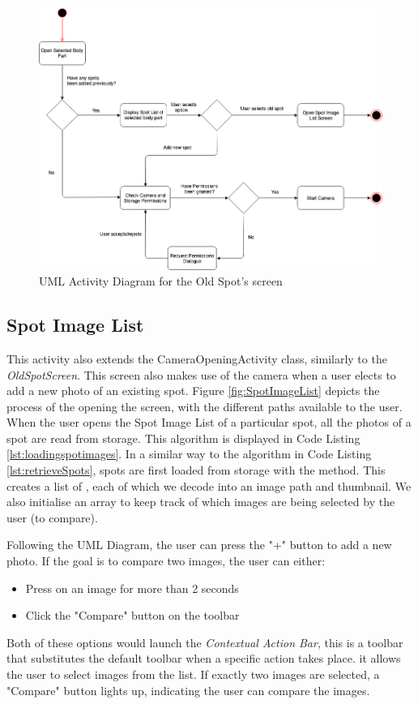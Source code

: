 \begin{figure}
    \includegraphics[width=1.2\textwidth, center]{figures/OldSpotList.png}
    \caption{UML Activity Diagram for the Old Spot's screen}
    \label{fig:OldSpotList}
\end{figure}

\subsection{Spot Image List}

This activity also extends the CameraOpeningActivity class, similarly to the \emph{OldSpotScreen}. This screen also makes use of the camera when a user elects to add a new photo of an existing spot. Figure \ref{fig:SpotImageList} depicts the process of the opening the screen, with the different paths available to the user. When the user opens the Spot Image List of a particular spot, all the photos of a spot are read from storage. This algorithm is displayed in Code Listing \ref{lst:loadingspotimages}. In a similar way to the algorithm in Code Listing \ref{lst:retrieveSpots}, spots are first loaded from storage with the  method. This creates a list of , each of which we decode into an image path and thumbnail. We also initialise an array  to keep track of which images are being selected by the user (to compare).

Following the UML Diagram, the user can press the "+" button to add a new photo. If the goal is to compare two images, the user can either:
\begin{itemize}
    \item Press on an image for more than 2 seconds
    \item Click the "Compare" button on the toolbar
\end{itemize}
Both of these options would launch the \emph{Contextual Action Bar}, this is a toolbar that substitutes the default toolbar when a specific action takes place. it allows the user to select images from the list. If exactly two images are selected, a "Compare" button lights up, indicating the user can compare the images.

